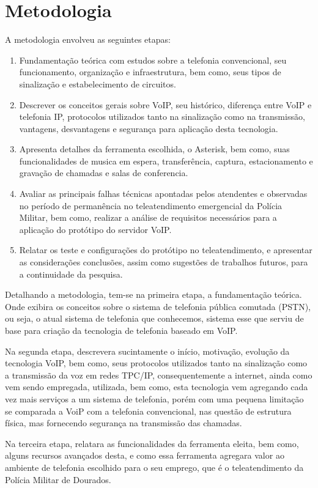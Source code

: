 \section{Metodologia}
A metodologia envolveu as seguintes etapas:
\begin{enumerate}
  \item Fundamentação teórica com estudos sobre a telefonia convencional, seu funcionamento, organização e infraestrutura, bem como, seus tipos de sinalização e estabelecimento de circuitos.
  \item Descrever os conceitos gerais sobre VoIP, seu histórico, diferença entre VoIP e telefonia IP, protocolos utilizados tanto na sinalização como na transmissão, vantagens, desvantagens e segurança para aplicação desta tecnologia.
  \item Apresenta detalhes da ferramenta escolhida, o Asterisk, bem como, suas funcionalidades de musica em espera, transferência, captura, estacionamento e gravação de chamadas e salas de conferencia.
  \item Avaliar as principais falhas técnicas apontadas pelos atendentes e observadas no período de permanência no teleatendimento emergencial da Polícia Militar, bem como, realizar a análise de requisitos necessários para a aplicação do protótipo do servidor VoIP.
  \item Relatar os teste e configurações do protótipo no teleatendimento, e apresentar as considerações conclusões, assim como sugestões de trabalhos futuros, para a continuidade da pesquisa.
\end{enumerate}

Detalhando a metodologia, tem-se na primeira etapa, a fundamentação teórica. Onde exibira os conceitos sobre o sistema de telefonia pública comutada (PSTN), ou seja, o atual sistema de telefonia que conhecemos, sistema esse que serviu de base para criação da tecnologia de telefonia baseado em VoIP.

	Na segunda etapa, descrevera sucintamente o início, motivação, evolução da tecnologia VoIP, bem como, seus protocolos utilizados tanto na sinalização como a transmissão da voz em redes TPC/IP, consequentemente a internet, ainda como vem sendo empregada, utilizada, bem como, esta tecnologia vem agregando cada vez mais serviços a um sistema de telefonia, porém com uma pequena limitação se comparada a VoiP com a telefonia convencional, nas questão de estrutura física, mas fornecendo segurança na transmissão das chamadas.

	Na  terceira etapa, relatara as funcionalidades da ferramenta eleita, bem como, alguns recursos avançados desta, e como essa ferramenta agregara valor ao ambiente de telefonia escolhido para o seu emprego, que é o teleatendimento da Polícia Militar de Dourados.

